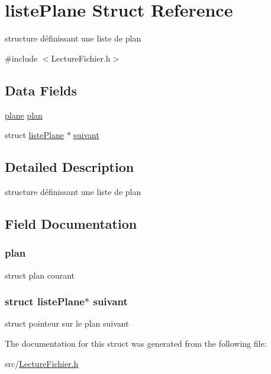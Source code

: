 \hypertarget{structliste_plane}{
\section{listePlane Struct Reference}
\label{structliste_plane}
}


structure définissant une liste de plan  




{\ttfamily \#include $<$LectureFichier.h$>$}

\subsection*{Data Fields}
\begin{DoxyCompactItemize}
\item 
\hyperlink{structplane}{plane} \hyperlink{structliste_plane_a665658caaf1410dd20eff043eb78813b}{plan}
\item 
struct \hyperlink{structliste_plane}{listePlane} $\ast$ \hyperlink{structliste_plane_a609fce9ee115f8437dbc4f71b2a698d1}{suivant}
\end{DoxyCompactItemize}


\subsection{Detailed Description}
structure définissant une liste de plan 

\subsection{Field Documentation}
\hypertarget{structliste_plane_a665658caaf1410dd20eff043eb78813b}{
\subsubsection[{plan}]{ {\bf plan}}}
\label{structliste_plane_a665658caaf1410dd20eff043eb78813b}
struct plan courant \hypertarget{structliste_plane_a609fce9ee115f8437dbc4f71b2a698d1}{
\subsubsection[{suivant}]{\setlength{\rightskip}{0pt plus 5cm}struct {\bf listePlane}$\ast$ {\bf suivant}}}
\label{structliste_plane_a609fce9ee115f8437dbc4f71b2a698d1}
struct pointeur sur le plan suivant 

The documentation for this struct was generated from the following file:\begin{DoxyCompactItemize}
\item 
src/\hyperlink{_lecture_fichier_8h}{LectureFichier.h}\end{DoxyCompactItemize}

